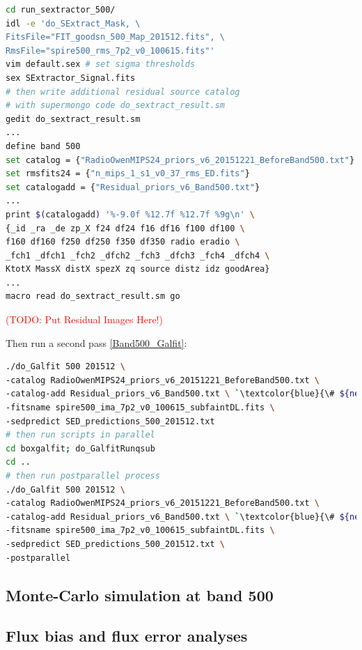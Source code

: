 \documentclass[11pt,a4paper]{article}
\begin{document}
\begin{lstlisting}[language=bash]
cd run_sextractor_500/
idl -e 'do_SExtract_Mask, \
FitsFile="FIT_goodsn_500_Map_201512.fits", \
RmsFile="spire500_rms_7p2_v0_100615.fits"'
vim default.sex # set sigma thresholds
sex SExtractor_Signal.fits
# then write additional residual source catalog
# with supermongo code do_sextract_result.sm
gedit do_sextract_result.sm
...
define band 500
set catalog = {"RadioOwenMIPS24_priors_v6_20151221_BeforeBand500.txt"}
set rmsfits24 = {"n_mips_1_s1_v0_37_rms_ED.fits"}
set catalogadd = {"Residual_priors_v6_Band500.txt"}
...
print $(catalogadd) '%-9.0f %12.7f %12.7f %9g\n' \
{_id _ra _de zp_X f24 df24 f16 df16 f100 df100 \
f160 df160 f250 df250 f350 df350 radio eradio \
_fch1 _dfch1 _fch2 _dfch2 _fch3 _dfch3 _fch4 _dfch4 \
KtotX MassX distX spezX zq source distz idz goodArea}
...
macro read do_sextract_result.sm go
\end{lstlisting}

\textcolor{red}{(TODO: Put Residual Images Here!)}

Then run a second pass \ref{Band500_Galfit}: 

\begin{lstlisting}[language=bash]
./do_Galfit 500 201512 \
-catalog RadioOwenMIPS24_priors_v6_20151221_BeforeBand500.txt \
-catalog-add Residual_priors_v6_Band500.txt \ `\textcolor{blue}{\# ${new!}$}`
-fitsname spire500_ima_7p2_v0_100615_subfaintDL.fits \
-sedpredict SED_predictions_500_201512.txt
# then run scripts in parallel 
cd boxgalfit; do_GalfitRunqsub
cd ..
# then run postparallel process
./do_Galfit 500 201512 \
-catalog RadioOwenMIPS24_priors_v6_20151221_BeforeBand500.txt \
-catalog-add Residual_priors_v6_Band500.txt \ `\textcolor{blue}{\# ${new!}$}`
-fitsname spire500_ima_7p2_v0_100615_subfaintDL.fits \
-sedpredict SED_predictions_500_201512.txt \
-postparallel
\end{lstlisting}

\subsection{Monte-Carlo simulation at band 500}
\label{Band500_Galsim}


\subsection{Flux bias and flux error analyses}
\label{Band500_simanalyses}
\end{document}
